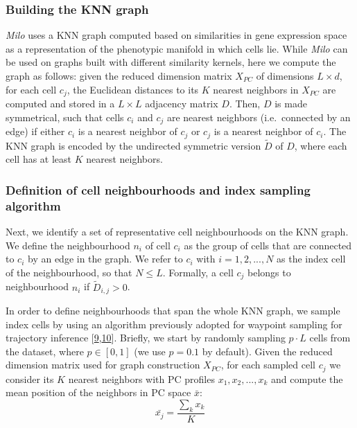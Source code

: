 \documentclass[
]{article}
\begin{document}
\hypertarget{building-the-knn-graph}{%
\subsubsection{Building the KNN graph}\label{building-the-knn-graph}}

\emph{Milo} uses a KNN graph computed based on similarities in gene expression space as a representation of the phenotypic manifold in which cells lie. While \emph{Milo} can be used on graphs built with different similarity kernels, here we compute the graph as follows: given the reduced dimension matrix \(X_{PC}\) of dimensions \(L \times d\), for each cell \(c_j\), the Euclidean distances to its \(K\) nearest neighbors in \(X_{PC}\) are computed and stored in a \(L \times L\) adjacency matrix \(D\). Then, \(D\) is made symmetrical, such that cells \(c_i\) and \(c_j\) are nearest neighbors (i.e.~connected by an edge) if either \(c_i\) is a nearest neighbor of \(c_j\) or \(c_j\) is a nearest neighbor of \(c_i\). The KNN graph is encoded by the undirected symmetric version \(\tilde{D}\) of \(D\), where each cell has at least \(K\) nearest neighbors.

\hypertarget{nh}{%
\subsubsection{Definition of cell neighbourhoods and index sampling algorithm}\label{nh}}

Next, we identify a set of representative cell neighbourhoods on the KNN graph. We define the neighbourhood \(n_i\) of cell \(c_i\) as the group of cells that are connected to \(c_i\) by an edge in the graph. We refer to \(c_i\) with \(i=1,2,...,N\) as the index cell of the neighbourhood, so that \(N \leq L\).
Formally, a cell \(c_j\) belongs to neighbourhood \(n_i\) if \(\tilde{D}_{i,j} > 0\).

In order to define neighbourhoods that span the whole KNN graph, we sample index cells by using an algorithm previously adopted for waypoint sampling for trajectory inference {[}\protect\hyperlink{ref-gutTrajectoriesCellcycleProgression2015}{9},\protect\hyperlink{ref-settyWishboneIdentifiesBifurcating2016}{10}{]}.
Briefly, we start by randomly sampling \(p \cdot L\) cells from the dataset, where \(p \in [0,1]\) (we use \(p = 0.1\) by default).
Given the reduced dimension matrix used for graph construction \(X_{PC}\), for each sampled cell \(c_j\) we consider its \(K\) nearest neighbors with PC profiles \({x_1, x_2, ... , x_k}\) and compute the mean position of the neighbors in PC space \(\bar{x}\):
\[
\bar{x_j} = \frac{ \sum_k x_k }{K}
\]
\end{document}
